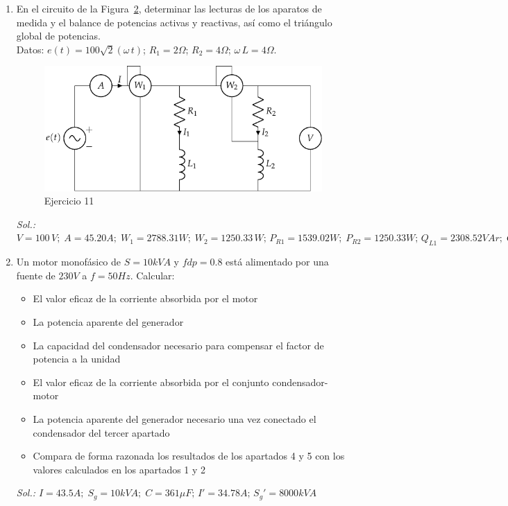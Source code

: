 \begin{enumerate}
\begin{figure}[H]
    \caption{Ejercicio 10}
    \label{fig.ej9_BT2}
\end{figure}
\emph{Sol.: $\overline{R}=33.33\phase{0^\circ}\Omega; \,\overline{X_c}-\mathrm{j}\,25\Omega;\,\overline{Z}=16+\mathrm{j}\,12\Omega;\,\overline{U_{AC}}=212.13\phase{45^\circ} V$}
\item En el circuito de la Figura~\ref{fig.ej11_BT2}, determinar las lecturas de los aparatos de medida y el balance de potencias activas y reactivas, así como el triángulo global de potencias.\\
Datos: $e(t)=100\sqrt{2}(\omega\,t)$; $R_1=2\Omega$; $R_2=4\Omega$; $\omega\,L=4\Omega$.
\begin{figure}[H]
    \centering
    \includegraphics{../figs/ej11_BT2.pdf}
    \caption{Ejercicio 11}
    \label{fig.ej11_BT2}
\end{figure}
\emph{Sol.: $V=100\,V;\;A = 45.20 A;\;W_1=2788.31W;\;W_2=1250.33\,W;\,P_{R1}=1539.02 W;\;P_{R2}=1250.33 W;\,Q_{L1}=2308.52 VAr;\;Q_{L2}=1250.33 VAr;\,P_T=2789.35 W;\,Q_T=3558.82 VAr;\;\overline{S_T}=2789.35+\mathrm{j}3558.82 VA$}
\item Un motor monofásico de $S = {10}{kVA}$ y $fdp = 0.8$ está alimentado por una fuente de ${230}{V}$ a $f = {50}{Hz}$.
Calcular:
\begin{itemize}
    \item El valor eficaz de la corriente absorbida por el motor
    \item La potencia aparente del generador
    \item La capacidad del condensador necesario para compensar el factor de potencia a la unidad
    \item El valor eficaz de la corriente absorbida por el conjunto condensador-motor
    \item La potencia aparente del generador necesario una vez conectado el condensador del tercer apartado
    \item Compara de forma razonada los resultados de los apartados 4 y 5 con los valores calculados en los apartados 1 y 2
\end{itemize}
\emph{Sol.: $I= {43.5}{A};\; S_g = {10}{kVA};\;C={361}{\mu F};\, I'=34.78A;\, S_g' = {8000}{kVA}$}


\end{enumerate}
